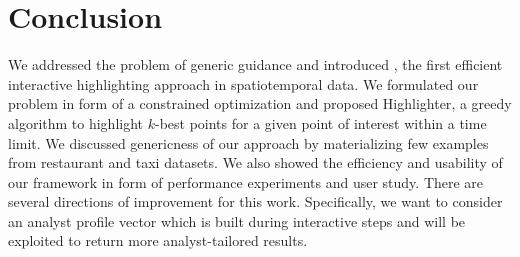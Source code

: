 \section{Conclusion}
\label{sec:conc}
We addressed the problem of generic guidance and introduced \framework, the first efficient interactive highlighting approach in spatiotemporal data. We formulated our problem in form of a constrained optimization and proposed {\sc Highlighter}, a greedy algorithm to highlight $k$-best points for a given point of interest within a time limit. We discussed genericness of our approach by materializing few examples from restaurant and taxi datasets. We also showed the efficiency and usability of our framework in form of performance experiments and user study. There are several directions of improvement for this work. Specifically, we want to consider an analyst profile vector which is built during interactive steps and will be exploited to return more analyst-tailored results.